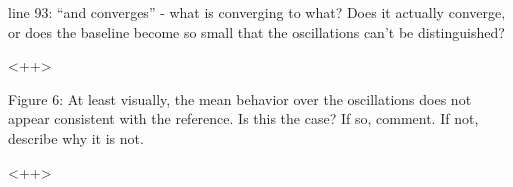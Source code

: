 \documentclass[answers,11pt]{exam}
\begin{document}
\begin{questions}

        \question line 93: ``and converges'' - what is converging to what?  
        Does it actually converge, or does the baseline become so small that 
        the oscillations can't be distinguished?

        \begin{solution}
        <++>
        \end{solution}


        \question Figure 6: At least visually, the mean behavior over the 
        oscillations does not appear consistent with the reference.  Is this 
        the case? If so, comment.  If not, describe why it is not.

        \begin{solution}
        <++>
        \end{solution}


\end{questions}


\end{document}
